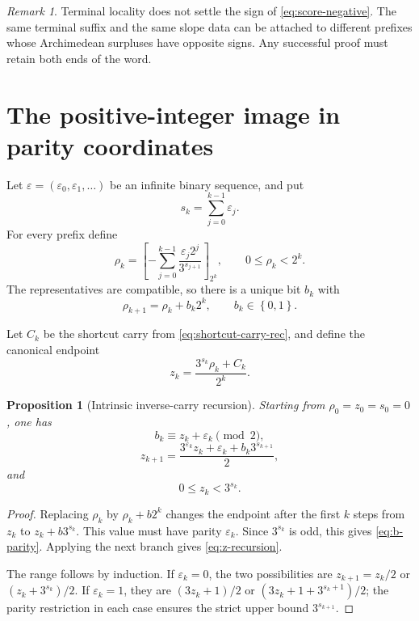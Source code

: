 \documentclass[11pt,reqno]{amsart}
\numberwithin{equation}{section}
\newtheorem{proposition}[theorem]{Proposition}
\theoremstyle{definition}
\theoremstyle{remark}
\newtheorem{remark}[theorem]{Remark}
\newcommand{\eps}{\varepsilon}
\newcommand{\set}[1]{\left\{#1\right\}}
\begin{document}
\begin{remark}
Terminal locality does not settle the sign of
\eqref{eq:score-negative}.  The same terminal suffix and the same slope data
can be attached to different prefixes whose Archimedean surpluses have
opposite signs.  Any successful proof must retain both ends of the word.
\end{remark}

\section{The positive-integer image in parity coordinates}\label{sec:inverse-carry}

Let $\eps=(\eps_0,\eps_1,\ldots)$ be an infinite binary sequence, and put
\[
s_k=\sum_{j=0}^{k-1}\eps_j.
\]
For every prefix define
\begin{equation}\label{eq:rho-k}
\rho_k
=
\left[
-\sum_{j=0}^{k-1}
\frac{\eps_j2^j}{3^{s_{j+1}}}
\right]_{2^k},
\qquad
0\le\rho_k<2^k.
\end{equation}
The representatives are compatible, so there is a unique bit $b_k$ with
\begin{equation}\label{eq:inverse-carry-bit}
\rho_{k+1}=\rho_k+b_k2^k,
\qquad b_k\in\set{0,1}.
\end{equation}

Let $C_k$ be the shortcut carry from \eqref{eq:shortcut-carry-rec}, and
define the canonical endpoint
\begin{equation}\label{eq:z-k}
z_k=\frac{3^{s_k}\rho_k+C_k}{2^k}.
\end{equation}

\begin{proposition}[Intrinsic inverse-carry recursion]\label{prop:carry-recursion}
Starting from $\rho_0=z_0=s_0=0$, one has
\begin{equation}\label{eq:b-parity}
b_k\equiv z_k+\eps_k\pmod2,
\end{equation}
\begin{equation}\label{eq:z-recursion}
z_{k+1}
=
\frac{3^{\eps_k}z_k+\eps_k+b_k3^{s_{k+1}}}{2},
\end{equation}
and
\begin{equation}\label{eq:z-range}
0\le z_k<3^{s_k}.
\end{equation}
\end{proposition}

\begin{proof}
Replacing $\rho_k$ by $\rho_k+b2^k$ changes the endpoint after the first $k$
steps from $z_k$ to $z_k+b3^{s_k}$.  This value must have parity $\eps_k$.
Since $3^{s_k}$ is odd, this gives \eqref{eq:b-parity}.  Applying the next
branch gives \eqref{eq:z-recursion}.

The range follows by induction.  If $\eps_k=0$, the two possibilities are
$z_{k+1}=z_k/2$ or $(z_k+3^{s_k})/2$.  If $\eps_k=1$, they are
$(3z_k+1)/2$ or $(3z_k+1+3^{s_k+1})/2$; the parity restriction in each case
ensures the strict upper bound $3^{s_{k+1}}$.
\end{proof}
\end{document}
